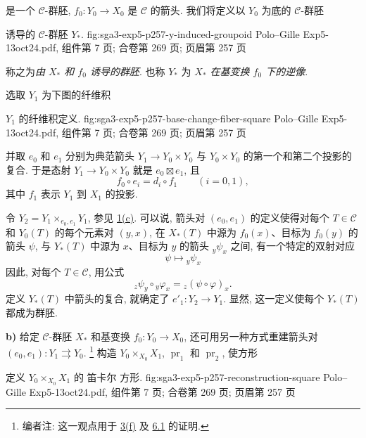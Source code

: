 \noindent 是一个 \(\mathscr C\)-群胚, \(f_0:Y_0\to X_0\)
是 \(\mathscr C\) 的箭头. 我们将定义以 \(Y_0\) 为底的
\(\mathscr C\)-群胚

  {诱导的 \(\mathscr C\)-群胚 \(Y_\ast\).}
  {fig:sga3-exp5-p257-y-induced-groupoid}
  {Polo--Gille Exp5-13oct24.pdf, 组件第 7 页; 合卷第 269 页; 页眉第 257 页}

\noindent 称之为\emph{由 \(X_\ast\) 和 \(f_0\) 诱导的群胚}.
也称 \(Y_\ast\) 为 \emph{\(X_\ast\) 在基变换 \(f_0\) 下的逆像}.

选取 \(Y_1\) 为下图的纤维积

  {\(Y_1\) 的纤维积定义.}
  {fig:sga3-exp5-p257-base-change-fiber-square}
  {Polo--Gille Exp5-13oct24.pdf, 组件第 7 页; 合卷第 269 页; 页眉第 257 页}

\noindent 并取 \(e_0\) 和 \(e_1\) 分别为典范箭头
\(Y_1\to Y_0\times Y_0\) 与 \(Y_0\times Y_0\)
的第一个和第二个投影的复合. 于是态射 \(Y_1\to Y_0\times Y_0\)
就是 \(e_0\boxtimes e_1\), 且
\[
  f_0\circ e_i=d_i\circ f_1\qquad(i=0,1),
\]
其中 \(f_1\) 表示 \(Y_1\) 到 \(X_1\) 的投影.

令 \(Y_2=Y_1\times_{e_0,e_1}Y_1\), 参见
\hyperref[par:sga3-V-1-c]{1(c)}.
可以说, 箭头对 \((e_0,e_1)\) 的定义使得对每个
\(T\in\mathscr C\) 和 \(Y_0(T)\) 的每个元素对 \((y,x)\),
在 \(X_\ast(T)\) 中源为 \(f_0(x)\)、目标为 \(f_0(y)\) 的箭头 \(\psi\),
与 \(Y_\ast(T)\) 中源为 \(x\)、目标为 \(y\) 的箭头 \({}_{y}\psi_x\)
之间, 有一个特定的双射对应
\[
  \psi\longmapsto{}_{y}\psi_{x}
\]
因此, 对每个 \(T\in\mathscr C\), 用公式
\[
  {}_{z}\psi_y\circ{}_{y}\varphi_x
  ={}_{z}(\psi\circ\varphi)_x.
\]
定义 \(Y_\ast(T)\) 中箭头的复合, 就确定了 \(e'_1:Y_2\to Y_1\).
显然, 这一定义使每个 \(Y_\ast(T)\) 都成为群胚.

\medskip
{}\label{par:sga3-V-3-b}%
\noindent\textbf{b)} 给定 \(\mathscr C\)-群胚 \(X_\ast\)
和基变换 \(f_0:Y_0\to X_0\), 还可用另一种方式重建箭头对
\((e_0,e_1):Y_1\rightrightarrows Y_0\).%
\footnote{\label{note:sga3-V-11}编者注: 这一观点用于
\hyperref[par:sga3-V-3-f]{3(f)} 及 \hyperref[lem:sga3-V-6.1]{6.1} 的证明.}
构造 \(Y_0\times_{X_0}X_1\), \(\operatorname{pr}_1\)
和 \(\operatorname{pr}_2\), 使方形

  {定义 \(Y_0\times_{X_0}X_1\) 的 笛卡尔 方形.}
  {fig:sga3-exp5-p257-reconstruction-square}
  {Polo--Gille Exp5-13oct24.pdf, 组件第 7 页; 合卷第 269 页; 页眉第 257 页}

